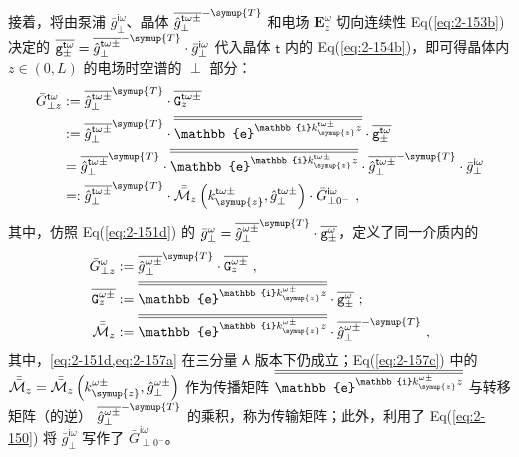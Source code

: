 接着，将由泵浦 $\bar{g}^{\mathsf{i}\omega}_{\perp}$、晶体 $\overline{\hat{g}^{\mathsf{t}\omega\pm}_{\perp}}^{-\symup{T}}$ 和电场 $\symbf E^{\omega}_z$ 切向连续性 Eq(\ref{eq:2-153b}) 决定的 $\overline{{\mathtt{g}}^{\mathsf{t}\omega}_{\pm}} = \overline{\hat{g}^{\mathsf{t}\omega\pm}_{\perp}}^{-\symup{T}} \cdot \bar{g}^{\mathsf{i}\omega}_{\perp}$ 代入晶体 $\mathsf{t}$ 内的 Eq(\ref{eq:2-154b})，即可得晶体内 $z \in \left( 0, L \right)$ 的电场时空谱的 $\perp$ 部分：
\begin{subequations} \label{eq:2-156}
	\begin{align}
		\bar{G}^{\mathsf{t}\omega}_{\perp z} &:= \overline{\hat{g}^{\mathsf{t}\omega\pm}_{\perp}}^{\symup{T}} \cdot \overline{{\mathtt{G}}^{\mathsf{t}\omega\pm}_{z}} \label{eq:2-156a}\\&:= \overline{\hat{g}^{\mathsf{t}\omega\pm}_{\perp}}^{\symup{T}} \cdot \overline{\overline{\mathbb{e}^{ \mathbb{i} k^{\mathsf{t}\omega\pm}_{\symup{z}} z}}} \cdot \overline{{\mathtt{g}}^{\mathsf{t}\omega}_{\pm}} \label{eq:2-156b}\\&= \overline{\hat{g}^{\mathsf{t}\omega\pm}_{\perp}}^{\symup{T}} \cdot \overline{\overline{\mathbb{e}^{ \mathbb{i} k^{\mathsf{t}\omega\pm}_{\symup{z}} z}}} \cdot \overline{\hat{g}^{\mathsf{t}\omega\pm}_{\perp}}^{-\symup{T}} \cdot \bar{g}^{\mathsf{i}\omega}_{\perp} \label{eq:2-156c}\\&=: \overline{\hat{g}^{\mathsf{t}\omega\pm}_{\perp}}^{\symup{T}} \cdot \bar{\bar{\mathcal{M}}}_z \left( k^{\mathsf{t}\omega\pm}_{\symup{z}}, \hat{g}^{\mathsf{t}\omega\pm}_{\perp} \right) \cdot \bar{G}^{\mathsf{i}\omega}_{\perp 0^-} \label{eq:2-156d}~,
	\end{align}
\end{subequations}
其中，仿照 Eq(\ref{eq:2-151d}) 的 $\bar{g}^{\omega}_{\perp} = \overline{\hat{g}^{\omega\pm}_{\perp}}^{\symup{T}} \cdot \overline{{\mathtt{g}}^{\omega}_{\pm}}$，定义了同一介质内的
\begin{subequations} \label{eq:2-157}
	\begin{align}
		\bar{G}^{\omega}_{\perp z} &:= \overline{\hat{g}^{\omega\pm}_{\perp}}^{\symup{T}} \cdot \overline{{\mathtt{G}}^{\omega\pm}_{z}} \label{eq:2-157a}~,\\ \overline{{\mathtt{G}}^{\omega\pm}_{z}} &:= \overline{\overline{\mathbb{e}^{ \mathbb{i} k^{\omega\pm}_{\symup{z}} z}}} \cdot \overline{{\mathtt{g}}^{\omega}_{\pm}} \label{eq:2-157b}~;\\ \bar{\bar{\mathcal{M}}}_z &:= \overline{\overline{\mathbb{e}^{ \mathbb{i} k^{\omega\pm}_{\symup{z}} z}}} \cdot \overline{\hat{g}^{\omega\pm}_{\perp}}^{-\symup{T}} \label{eq:2-157c}~,
	\end{align}
\end{subequations}
其中，\cref{eq:2-151d,eq:2-157a} 在三分量 $\Yup$ 版本下仍成立；Eq(\ref{eq:2-157c}) 中的 $\bar{\bar{\mathcal{M}}}_z = \bar{\bar{\mathcal{M}}}_z \left( k^{\omega\pm}_{\symup{z}}, \hat{g}^{\omega\pm}_{\perp} \right)$ 作为传播矩阵 $\overline{\overline{\mathbb{e}^{ \mathbb{i} k^{\omega\pm}_{\symup{z}} z}}}$ 与转移矩阵（的逆） $\overline{\hat{g}^{\omega\pm}_{\perp}}^{-\symup{T}}$ 的乘积，称为传输矩阵；此外，利用了 Eq(\ref{eq:2-150}) 将 $\bar{g}^{\mathsf{i}\omega}_{\perp}$ 写作了 $\bar{G}^{\mathsf{i}\omega}_{\perp 0^-}$。

